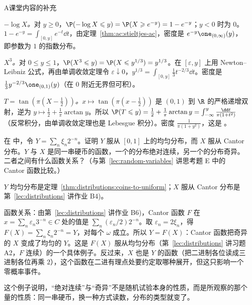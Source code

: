 \begin{exercises}{A}{课堂内容的补充}
\begin{solution}
\emph{$-\log X$。}对 $y\geqslant0$，$\P(-\log X\leqslant y)=\P(X\geqslant e^{-y})=1-e^{-y}$；$y<0$ 时为 $0$。$1-e^{-y}=\int_{[0,y]}e^{-t}\dd t$，由定理~\ref{thm:ac:stieltjes-ac}，密度是 $e^{-y}\one_{(0,\infty)}(y)$，即参数为 $1$ 的指数分布。

\emph{$X^3$。}对 $0\leqslant y\leqslant1$，$\P(X^3\leqslant y)=\P(X\leqslant y^{1/3})=y^{1/3}$。在 $[\varepsilon,y]$ 上用 Newton--Leibniz 公式，再由单调收敛定理令 $\varepsilon\downarrow0$，$y^{1/3}=\int_{[0,y]}\frac13t^{-2/3}\dd t$。密度是 $\frac13y^{-2/3}\one_{(0,1)}(y)$（在 $0$ 附近无界但可积）。

\emph{$T=\tan(\pi(X-\frac12))$。}$x\mapsto\tan(\pi(x-\frac12))$ 是 $(0,1)$ 到 $\R$ 的严格递增双射，逆为 $y\mapsto\frac12+\frac1\pi\arctan y$。所以 $\P(T\leqslant y)=\frac12+\frac1\pi\arctan y=\int_{-\infty}^y\frac{\dd t}{\pi(1+t^2)}$（反常积分，由单调收敛定理也是 Lebesgue 积分）。密度 $\frac1{\pi(1+y^2)}$，这是 。
\end{solution}

\item\label{ex:ac:A11} 在 中，令 $Y=\sum_n\xi_n2^{-n}$。证明 $Y$ 服从 $[0,1]$ 上的均匀分布，而 $X$ 服从 Cantor 分布。$Y$ 与 $X$ 是同一串硬币的函数，一个的分布绝对连续，另一个的分布奇异。二者之间有什么函数关系？（与第~\ref{lec:random-variables} 讲思考题 E 中的 Cantor 函数比较。）
\begin{solution}
$Y$ 均匀分布是定理~\ref{thm:distributions:coins-to-uniform}；$X$ 服从 Cantor 分布是第~\ref{lec:distributions} 讲作业 B4)。

函数关系：由第~\ref{lec:distributions} 讲作业 B6)，Cantor 函数 $F$ 在 $x=\sum_n\varepsilon_n3^{-n}\in C$ 处的值是 $\sum_n(\varepsilon_n/2)2^{-n}$。取 $\varepsilon_n=2\xi_n$，得 $F(X)=\sum_n\xi_n2^{-n}=Y$，对每个 $\omega$ 成立。所以 $Y=F(X)$：Cantor 函数把奇异的 $X$ 变成了均匀的 $Y$。这是 $F(X)$ 服从均匀分布（第~\ref{lec:distributions} 讲习题 A2，$F$ 连续）的一个具体例子。反过来，$X$ 也是 $Y$ 的函数（把二进制各位读成三进制各位再乘 $2$），这个函数在二进有理点处要约定取哪种展开，但这只影响一个零概率事件。

这个例子说明，“绝对连续”与“奇异”不是随机试验本身的性质，而是所观察的那个量的性质：同一串硬币，换一种方式读数，分布的类型就变了。
\end{solution}
\end{exercises}

